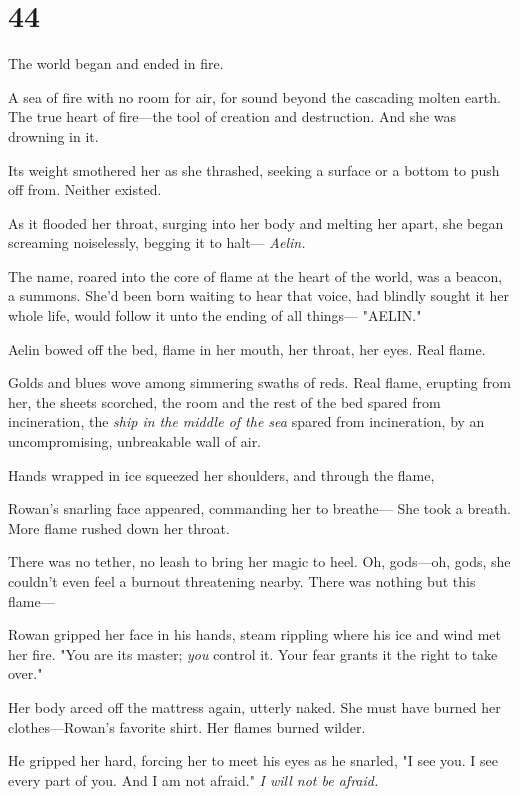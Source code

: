 
\chapter{44}

The world began and ended in fire.

A sea of fire with no room for air, for sound beyond the cascading molten earth.
The true heart of fire---the tool of creation and destruction.
And she was drowning in it.

Its weight smothered her as she thrashed, seeking a surface or a bottom to push off from.
Neither existed.

As it flooded her throat, surging into her body and melting her apart, she began screaming noiselessly, begging it to halt--- \emph{Aelin.}

The name, roared into the core of flame at the heart of the world, was a beacon, a summons.
She'd been born waiting to hear that voice, had blindly sought it her whole life, would follow it unto the ending of all things--- "AELIN."

Aelin bowed off the bed, flame in her mouth, her throat, her eyes.
Real flame.

Golds and blues wove among simmering swaths of reds.
Real flame, erupting from her, the sheets scorched, the room and the rest of the bed spared from incineration, the \emph{ship in the middle of the sea}
spared from incineration, by an uncompromising, unbreakable wall of air.

Hands wrapped in ice squeezed her shoulders, and through the flame,

Rowan's snarling face appeared, commanding her to breathe--- She took a breath.
More flame rushed down her throat.

There was no tether, no leash to bring her magic to heel.
Oh, gods---oh, gods, she couldn't even feel a burnout threatening nearby.
There was nothing but this flame---

Rowan gripped her face in his hands, steam rippling where his ice and wind met her fire.
"You are its master; \emph{you} control it.
Your fear grants it the right to take over."

Her body arced off the mattress again, utterly naked.
She must have burned her clothes---Rowan's favorite shirt.
Her flames burned wilder.

He gripped her hard, forcing her to meet his eyes as he snarled, "I see you.
I see every part of you.
And I am not afraid."
\emph{I will not be afraid.}

